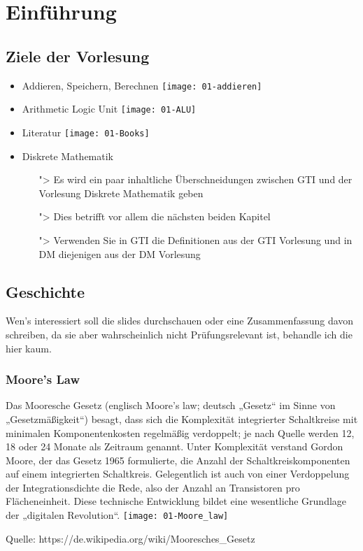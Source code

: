 \documentclass[../main.tex]{subfiles}
\begin{document}
\chapter{Einführung}\label{chp:real}
\section{Ziele der Vorlesung}
\begin{goals}
  \begin{itemize}
    \item Addieren, Speichern, Berechnen \newline
      \texttt{[image: 01-addieren]}
    \item Arithmetic Logic Unit \newline
      \texttt{[image: 01-ALU]}
    \item Literatur\newline
      \texttt{[image: 01-Books]}
    \item Diskrete Mathematik
      \begin{itemize}
      \item[">] Es wird ein paar inhaltliche Überschneidungen zwischen GTI
      und der Vorlesung Diskrete Mathematik geben
      \item[">]Dies betrifft vor allem die nächsten beiden Kapitel
      \item[">]Verwenden Sie in GTI die Definitionen aus der GTI Vorlesung
      und in DM diejenigen aus der DM Vorlesung
      \end{itemize}
  \end{itemize}
\end{goals}
\section{Geschichte}
Wen's interessiert soll die slides durchschauen oder eine Zusammenfassung davon schreiben, da sie aber wahrscheinlich nicht
Prüfungsrelevant ist, behandle ich die hier kaum. 
\subsection{Moore's Law}
\label{subsec:moore's_law}{}
\begin{moore_law}
  Das Mooresche Gesetz (englisch Moore’s law; deutsch „Gesetz“ im Sinne von „Gesetzmäßigkeit“) besagt, 
  dass sich die Komplexität integrierter Schaltkreise mit minimalen Komponentenkosten regelmäßig verdoppelt; 
  je nach Quelle werden 12, 18 oder 24 Monate als Zeitraum genannt. Unter Komplexität verstand Gordon Moore, 
  der das Gesetz 1965 formulierte, die Anzahl der Schaltkreiskomponenten auf einem integrierten Schaltkreis. Gelegentlich 
  ist auch von einer Verdoppelung der Integrationsdichte die Rede, also der Anzahl an Transistoren pro Flächeneinheit. 
  Diese technische Entwicklung bildet eine wesentliche Grundlage der „digitalen Revolution“.
  \newline
  \texttt{[image: 01-Moore\_law]}
\end{moore_law}
Quelle: https://de.wikipedia.org/wiki/Mooresches\_Gesetz
\end{document}
